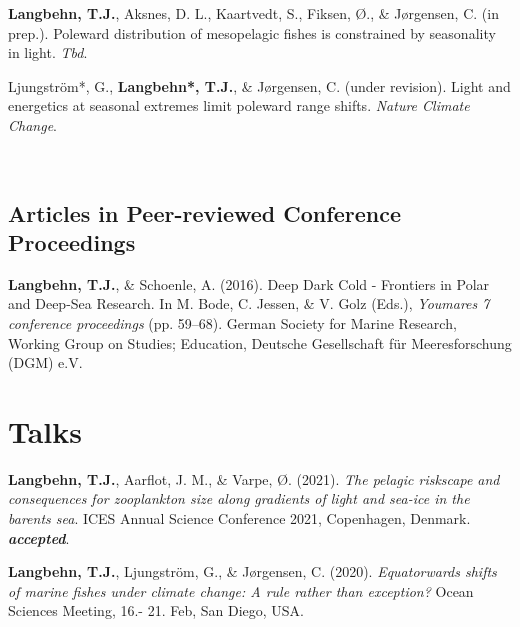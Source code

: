 \documentclass[11pt, a4paper]{awesome-cv}
\begin{document}
\leavevmode\hypertarget{ref-Langbehnh}{}%
\textbf{Langbehn, T.J.}, Aksnes, D. L., Kaartvedt, S., Fiksen, Ø., \&
Jørgensen, C. (in prep.). Poleward distribution of mesopelagic fishes is
constrained by seasonality in light. \emph{Tbd}.

\leavevmode\hypertarget{ref-Ljungstrom}{}%
Ljungström*, G., \textbf{Langbehn*, T.J.}, \& Jørgensen, C. (under
revision). Light and energetics at seasonal extremes limit poleward
range shifts. \emph{Nature Climate Change}.

\endgroup

~

\hypertarget{articles-in-peer-reviewed-conference-proceedings}{%
\subsection{Articles in Peer-reviewed Conference
Proceedings}\label{articles-in-peer-reviewed-conference-proceedings}}

\begingroup
\setlength{\parindent}{-0.5in}
\setlength{\leftskip}{0.5in}

\hypertarget{refs_proceedings}{}
\leavevmode\hypertarget{ref-Langbehn2016c}{}%
\textbf{Langbehn, T.J.}, \& Schoenle, A. (2016). Deep \textbar{} Dark
\textbar{} Cold - Frontiers in Polar and Deep-Sea Research. In M. Bode,
C. Jessen, \& V. Golz (Eds.), \emph{Youmares 7 conference proceedings}
(pp. 59--68). German Society for Marine Research, Working Group on
Studies; Education, Deutsche Gesellschaft für Meeresforschung (DGM) e.V.

\endgroup

\hypertarget{talks}{%
\section{Talks}\label{talks}}

\begingroup
\setlength{\parindent}{-0.5in}
\setlength{\leftskip}{0.5in}

\hypertarget{refs_talks}{}
\leavevmode\hypertarget{ref-Langbehn12}{}%
\textbf{Langbehn, T.J.}, Aarflot, J. M., \& Varpe, Ø. (2021). \emph{The
pelagic riskscape and consequences for zooplankton size along gradients
of light and sea-ice in the barents sea}. ICES Annual Science Conference
2021, Copenhagen, Denmark. \emph{\textbf{accepted}}.

\leavevmode\hypertarget{ref-Langbehn11}{}%
\textbf{Langbehn, T.J.}, Ljungström, G., \& Jørgensen, C. (2020).
\emph{Equatorwards shifts of marine fishes under climate change: A rule
rather than exception?} Ocean Sciences Meeting, 16.- 21. Feb, San Diego,
USA.
\end{document}
